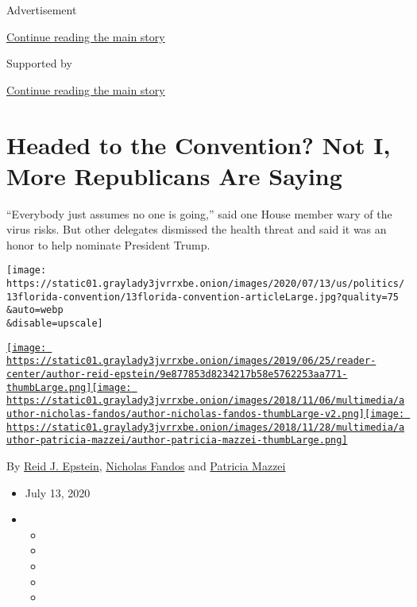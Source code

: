 Advertisement

\protect\hyperlink{after-top}{Continue reading the main story}

Supported by

\protect\hyperlink{after-sponsor}{Continue reading the main story}

\hypertarget{headed-to-the-convention-not-i-more-republicans-are-saying}{%
\section{Headed to the Convention? Not I, More Republicans Are
Saying}\label{headed-to-the-convention-not-i-more-republicans-are-saying}}

``Everybody just assumes no one is going,'' said one House member wary
of the virus risks. But other delegates dismissed the health threat and
said it was an honor to help nominate President Trump.

\texttt{[image: https://static01.graylady3jvrrxbe.onion/images/2020/07/13/us/politics/13florida-convention/13florida-convention-articleLarge.jpg?quality=75\\\&auto=webp\\\&disable=upscale]}

\href{https://www.nytimes3xbfgragh.onion/by/reid-j-epstein}{\texttt{[image: https://static01.graylady3jvrrxbe.onion/images/2019/06/25/reader-center/author-reid-epstein/9e877853d8234217b58e5762253aa771-thumbLarge.png]}}\href{https://www.nytimes3xbfgragh.onion/by/nicholas-fandos}{\texttt{[image: https://static01.graylady3jvrrxbe.onion/images/2018/11/06/multimedia/author-nicholas-fandos/author-nicholas-fandos-thumbLarge-v2.png]}}\href{https://www.nytimes3xbfgragh.onion/by/patricia-mazzei}{\texttt{[image: https://static01.graylady3jvrrxbe.onion/images/2018/11/28/multimedia/author-patricia-mazzei/author-patricia-mazzei-thumbLarge.png]}}

By \href{https://www.nytimes3xbfgragh.onion/by/reid-j-epstein}{Reid J.
Epstein},
\href{https://www.nytimes3xbfgragh.onion/by/nicholas-fandos}{Nicholas
Fandos} and
\href{https://www.nytimes3xbfgragh.onion/by/patricia-mazzei}{Patricia
Mazzei}

\begin{itemize}
\item
  July 13, 2020
\item
  \begin{itemize}
  \item
  \item
  \item
  \item
  \item
  \end{itemize}
\end{itemize}

